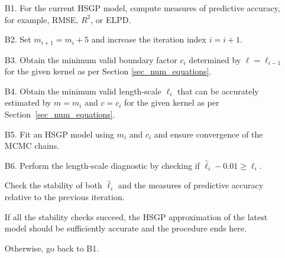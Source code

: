 \begin{enumerate}

\item[B1.] For the current HSGP model, compute measures of predictive accuracy, for example, RMSE, $R^2$, or ELPD.

\item[B2.] Set $m_{i+1} = m_{i} + 5$ and increase the iteration index $i = i + 1$.

\item[B3.] Obtain the minimum valid boundary factor $c_i$ determined by $\ell = \hat{\ell}_{i-1}$ for the given kernel as per Section \ref{sec_num_equations}.

\item[B4.] Obtain the minimum valid length-scale $\ell_i$ that can be accurately estimated by $m = m_i$ and $c = c_i$ for the given kernel as per Section~\ref{sec_num_equations}.

\item[B5.] Fit an HSGP model using $m_i$ and $c_i$ and ensure convergence of the MCMC chains.

\item[B6.] Perform the length-scale diagnostic by checking if $\hat{\ell}_i - 0.01 \geq \ell_i$. 

Check the stability of both $\hat{\ell}_i$ and the measures of predictive accuracy relative to the previous iteration.

If all the stability checks succeed, the HSGP approximation of the latest model should be sufficiently accurate and the procedure ends here.

Otherwise, go back to B1.
\end{enumerate}



